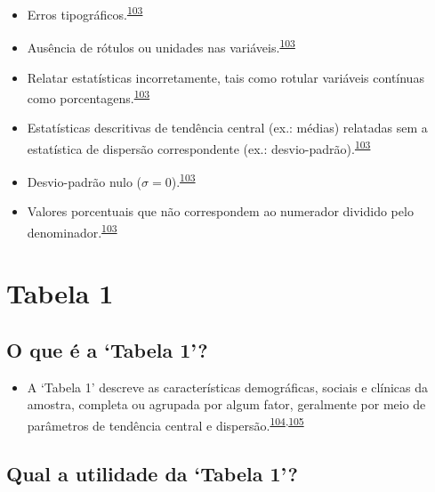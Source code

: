 \documentclass[
  a4paper,
]{book}
\providecommand{\tightlist}{%
  \setlength{\itemsep}{0pt}\setlength{\parskip}{0pt}}
\begin{document}
\begin{itemize}
\item
  Erros tipográficos.\textsuperscript{\protect\hyperlink{ref-barnett2023}{103}}
\item
  Ausência de rótulos ou unidades nas variáveis.\textsuperscript{\protect\hyperlink{ref-barnett2023}{103}}
\item
  Relatar estatísticas incorretamente, tais como rotular variáveis contínuas como porcentagens.\textsuperscript{\protect\hyperlink{ref-barnett2023}{103}}
\item
  Estatísticas descritivas de tendência central (ex.: médias) relatadas sem a estatística de dispersão correspondente (ex.: desvio-padrão).\textsuperscript{\protect\hyperlink{ref-barnett2023}{103}}
\item
  Desvio-padrão nulo (\(\sigma=0\)).\textsuperscript{\protect\hyperlink{ref-barnett2023}{103}}
\item
  Valores porcentuais que não correspondem ao numerador dividido pelo denominador.\textsuperscript{\protect\hyperlink{ref-barnett2023}{103}}
\end{itemize}

\hypertarget{tabela-1}{%
\section{Tabela 1}\label{tabela-1}}

\hypertarget{o-que-uxe9-a-tabela-1}{%
\subsection{O que é a `Tabela 1'?}\label{o-que-uxe9-a-tabela-1}}

\begin{itemize}
\tightlist
\item
  A `Tabela 1' descreve as características demográficas, sociais e clínicas da amostra, completa ou agrupada por algum fator, geralmente por meio de parâmetros de tendência central e dispersão.\textsuperscript{\protect\hyperlink{ref-Westreich2013}{104},\protect\hyperlink{ref-chen2020}{105}}
\end{itemize}

\hypertarget{qual-a-utilidade-da-tabela-1}{%
\subsection{Qual a utilidade da `Tabela 1'?}\label{qual-a-utilidade-da-tabela-1}}
\end{document}
